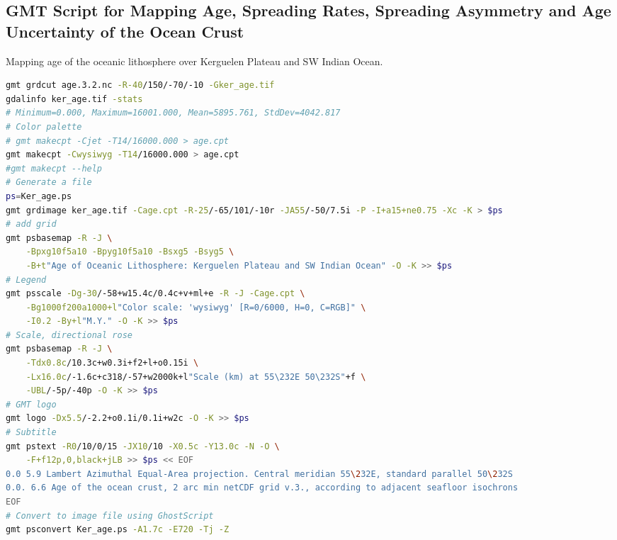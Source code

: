 \documentclass[geomatics,article,accept,pdftex,moreauthors]{Definitions/mdpi}
\begin{document}
\subsection[\appendixname~\thesubsection]{GMT Script for Mapping Age, Spreading Rates, Spreading Asymmetry and Age Uncertainty of the Ocean Crust}
\vspace{-9pt}
\begin{listing}[H]
\caption{Mapping age of the oceanic lithosphere over Kerguelen Plateau and SW Indian Ocean.}
\label{lst02}
\begin{lstlisting}[xleftmargin=10pt,xrightmargin=3.5pt,language=bash,caption={}]
gmt grdcut age.3.2.nc -R-40/150/-70/-10 -Gker_age.tif
gdalinfo ker_age.tif -stats
# Minimum=0.000, Maximum=16001.000, Mean=5895.761, StdDev=4042.817
# Color palette
# gmt makecpt -Cjet -T14/16000.000 > age.cpt
gmt makecpt -Cwysiwyg -T14/16000.000 > age.cpt
#gmt makecpt --help
# Generate a file
ps=Ker_age.ps
gmt grdimage ker_age.tif -Cage.cpt -R-25/-65/101/-10r -JA55/-50/7.5i -P -I+a15+ne0.75 -Xc -K > $ps
# add grid
gmt psbasemap -R -J \
    -Bpxg10f5a10 -Bpyg10f5a10 -Bsxg5 -Bsyg5 \
    -B+t"Age of Oceanic Lithosphere: Kerguelen Plateau and SW Indian Ocean" -O -K >> $ps
# Legend
gmt psscale -Dg-30/-58+w15.4c/0.4c+v+ml+e -R -J -Cage.cpt \
    -Bg1000f200a1000+l"Color scale: 'wysiwyg' [R=0/6000, H=0, C=RGB]" \
    -I0.2 -By+l"M.Y." -O -K >> $ps   
# Scale, directional rose
gmt psbasemap -R -J \
    -Tdx0.8c/10.3c+w0.3i+f2+l+o0.15i \
    -Lx16.0c/-1.6c+c318/-57+w2000k+l"Scale (km) at 55\232E 50\232S"+f \
    -UBL/-5p/-40p -O -K >> $ps
# GMT logo
gmt logo -Dx5.5/-2.2+o0.1i/0.1i+w2c -O -K >> $ps
# Subtitle
gmt pstext -R0/10/0/15 -JX10/10 -X0.5c -Y13.0c -N -O \
    -F+f12p,0,black+jLB >> $ps << EOF
0.0 5.9 Lambert Azimuthal Equal-Area projection. Central meridian 55\232E, standard parallel 50\232S
0.0. 6.6 Age of the ocean crust, 2 arc min netCDF grid v.3., according to adjacent seafloor isochrons
EOF
# Convert to image file using GhostScript
gmt psconvert Ker_age.ps -A1.7c -E720 -Tj -Z
\end{lstlisting}
\end{listing}
\end{document}
